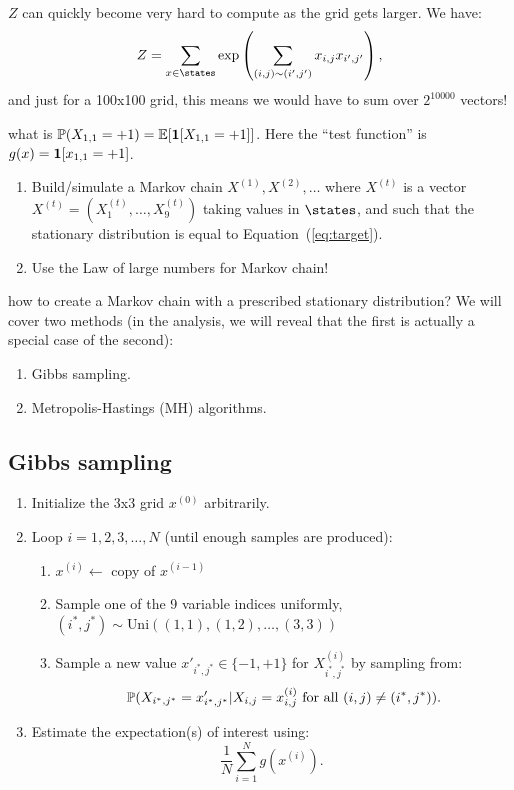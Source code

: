 \documentclass{article}
\begin{document}
 $Z$ can quickly become very hard to compute as the grid gets larger. We have: \[Z = \sum_{x \in \states} \exp\left( \sum_{(i,j)\sim(i',j')} x_{i,j} x_{i',j'} \right),\]and just for a 100x100 grid, this means we would have to sum over $2^10000$ vectors!

 what is $\P(X_{1,1} = +1) = \E[\1[X_{1,1} = +1]]$. Here the ``test function'' is $g(x) = \1[x_{1,1} = +1]$. 

\begin{enumerate}
  \item Build/simulate a Markov chain $X^{(1)}, X^{(2)}, \dots$ where $X^{(t)}$ is a vector $X^{(t)} = (X^{(t)}_1, \dots, X^{(t)}_9)$ taking values in $\states$, and such that the stationary distribution is equal to Equation~(\ref{eq:target}).
  \item Use the Law of large numbers for Markov chain!
\end{enumerate}

 how to create a Markov chain with a prescribed stationary distribution? We will cover two methods (in the analysis, we will reveal that the first is actually a special case of the second):
\begin{enumerate}
  \item Gibbs sampling.
  \item Metropolis-Hastings (MH) algorithms.
\end{enumerate}


\subsection{Gibbs sampling}

\begin{enumerate}
  \item Initialize the 3x3 grid $x^{(0)}$ arbitrarily.
  \item Loop $i = 1, 2, 3, \dots, N$ (until enough samples are produced):
  \begin{enumerate}
     \item $x^{(i)} \gets$ copy of $x^{(i-1)}$
     \item Sample one of the 9 variable indices uniformly, $(i^*, j^*) \sim \text{Uni}((1,1), (1,2), \dots, (3,3))$ \label{line:sampling-variable}
     \item Sample a new value $x'_{i^*,j^*}\in \{-1,+1\}$ for $X^{(i)}_{i^*, j^*}$ by sampling from:  \begin{equation}\label{eq:conditional-Gibbs} \P(X_{i^*,j^*} = x'_{i^*,j^*} | X_{i,j} = x^{(i)}_{i,j}\text{ for all }(i,j) \neq (i^*,j^*)). \end{equation}
  \end{enumerate}
  \item Estimate the expectation(s) of interest using: \[ \frac{1}{N} \sum_{i=1}^N g(x^{(i)}). \]
\end{enumerate}
\end{document}
